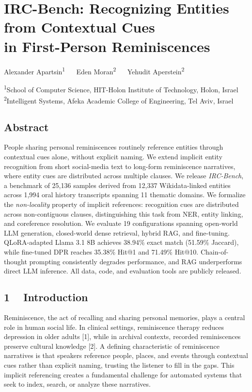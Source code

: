 \documentclass[
]{article}
\author{}
\date{}
\begin{document}
\section{\texorpdfstring{IRC-Bench: Recognizing Entities from Contextual
Cues\\
in First-Person
Reminiscences}{IRC-Bench: Recognizing Entities from Contextual Cues in First-Person Reminiscences}}\label{irc-bench-recognizing-entities-from-contextual-cues-in-first-person-reminiscences}

Alexander Apartsin\textsuperscript{1} ~~ Eden Moran\textsuperscript{2}
~~ Yehudit Aperstein\textsuperscript{2}

\textsuperscript{1}School of Computer Science, HIT-Holon Institute of
Technology, Holon, Israel\\
\textsuperscript{2}Intelligent Systems, Afeka Academic College of
Engineering, Tel Aviv, Israel

\subsection{Abstract}\label{abstract}

People sharing personal reminiscences routinely reference entities
through contextual cues alone, without explicit naming. We extend
implicit entity recognition from short social-media text to long-form
reminiscence narratives, where entity cues are distributed across
multiple clauses. We release \emph{IRC-Bench}, a benchmark of 25,136
samples derived from 12,337 Wikidata-linked entities across 1,994 oral
history transcripts spanning 11 thematic domains. We formalize the
\emph{non-locality} property of implicit references: recognition cues
are distributed across non-contiguous clauses, distinguishing this task
from NER, entity linking, and coreference resolution. We evaluate 19
configurations spanning open-world LLM generation, closed-world dense
retrieval, hybrid RAG, and fine-tuning. QLoRA-adapted Llama 3.1 8B
achieves 38.94\% exact match (51.59\% Jaccard), while fine-tuned DPR
reaches 35.38\% Hit@1 and 71.49\% Hit@10. Chain-of-thought prompting
consistently degrades performance, and RAG underperforms direct LLM
inference. All data, code, and evaluation tools are publicly released.

\subsection{1 ~ Introduction}\label{introduction}

Reminiscence, the act of recalling and sharing personal memories, plays
a central role in human social life. In clinical settings, reminiscence
therapy reduces depression in older adults {[}1{]}, while in archival
contexts, recorded reminiscences preserve cultural knowledge {[}2{]}. A
defining characteristic of reminiscence narratives is that speakers
reference people, places, and events through contextual cues rather than
explicit naming, trusting the listener to fill in the gaps. This
implicit referencing creates a fundamental challenge for automated
systems that seek to index, search, or analyze these narratives.
\end{document}
